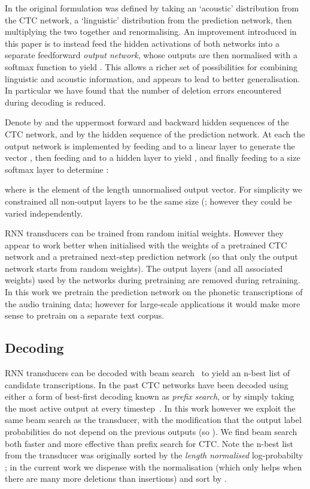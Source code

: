 \documentclass{article}
\begin{document}
In the original formulation  was defined by taking an `acoustic' distribution  from the CTC network, a `linguistic' distribution  from the prediction network, then multiplying the two together and renormalising.
An improvement introduced in this paper is to instead feed the hidden activations of both networks into a separate feedforward \emph{output network}, whose outputs are then normalised with a softmax function to yield .
This allows a richer set of possibilities for combining linguistic and acoustic information, and appears to lead to better generalisation.
In particular we have found that the number of deletion errors encountered during decoding is reduced.

Denote by  and  the uppermost forward and backward hidden sequences of the CTC network, and by  the hidden sequence of the prediction network.
At each  the output network is implemented by feeding  and  to a linear layer to generate the vector , then feeding  and  to a  hidden layer to yield , and finally feeding  to a size  softmax layer to determine :

where  is the  element of the length  unnormalised output vector.
For simplicity we constrained all non-output layers to be the same size (; however they could be varied independently.





RNN transducers can be trained from random initial weights.
However they appear to work better when initialised with the weights of a pretrained CTC network and a pretrained next-step prediction network (so that only the output network starts from random weights).
The output layers (and all associated weights) used by the networks during pretraining are removed during retraining.
In this work we pretrain the prediction network 
on the phonetic transcriptions of the audio training data; however for large-scale applications it would make more sense to pretrain on a separate text corpus.

\subsection{Decoding}
RNN transducers can be decoded with beam search~\cite{graves12transducer} to yield an n-best list of candidate transcriptions.
In the past CTC networks have been decoded using either a form of best-first decoding known as \emph{prefix search}, or by simply taking the most active output at every timestep~\cite{graves06icml}.
In this work however we exploit the same beam search as the transducer, with the modification that the output label probabilities  do not depend on the previous outputs (so ).
We find beam search both faster and more effective than prefix search for CTC.
Note the n-best list from the transducer was originally sorted by the \emph{length normalised} log-probabilty ; in the current work we dispense with the normalisation (which only helps when there are many more deletions than insertions) and sort by .
\end{document}
